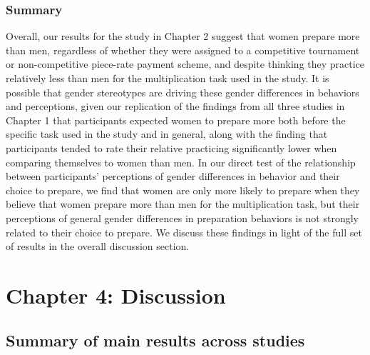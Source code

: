 \documentclass[letterpaper, nobind]{templates/ociamthesis}
\begin{document}
\hypertarget{summary-3}{%
\subsection{Summary}\label{summary-3}}

Overall, our results for the study in Chapter 2 suggest that women prepare more than men, regardless of whether they were assigned to a competitive tournament or non-competitive piece-rate payment scheme, and despite thinking they practice relatively less than men for the multiplication task used in the study. It is possible that gender stereotypes are driving these gender differences in behaviors and perceptions, given our replication of the findings from all three studies in Chapter 1 that participants expected women to prepare more both before the specific task used in the study and in general, along with the finding that participants tended to rate their relative practicing significantly lower when comparing themselves to women than men. In our direct test of the relationship between participants' perceptions of gender differences in behavior and their choice to prepare, we find that women are only more likely to prepare when they believe that women prepare more than men for the multiplication task, but their perceptions of general gender differences in preparation behaviors is not strongly related to their choice to prepare. We discuss these findings in light of the full set of results in the overall discussion section.

\hypertarget{chapter-4-discussion}{%
\chapter{Chapter 4: Discussion}\label{chapter-4-discussion}}

\adjustmtc
{}

\hypertarget{summary-of-main-results-across-studies}{%
\section{Summary of main results across studies}\label{summary-of-main-results-across-studies}}
\end{document}
